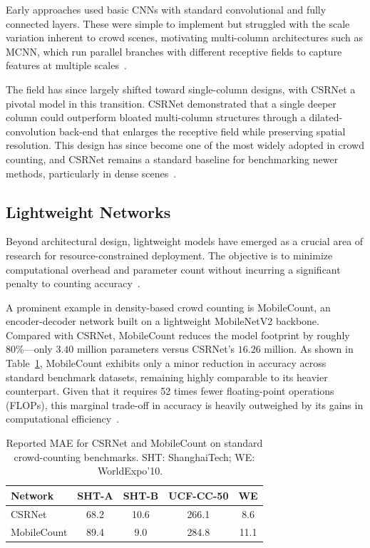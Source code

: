 \documentclass[conference]{IEEEtran}
\begin{document}
Early approaches used basic CNNs with standard convolutional and fully connected
layers. These were simple to implement but struggled with the scale variation
inherent to crowd scenes, motivating multi-column architectures such as MCNN,
which run parallel branches with different receptive fields to capture features
at multiple scales~\cite{Zhang_2016_CVPR}.

The field has since largely shifted toward single-column designs, with CSRNet a
pivotal model in this transition. CSRNet demonstrated that a single deeper column
could outperform bloated multi-column structures through a dilated-convolution
back-end that enlarges the receptive field while preserving spatial resolution.
This design has since become one of the most widely adopted in crowd counting,
and CSRNet remains a standard baseline for benchmarking newer methods,
particularly in dense scenes~\cite{gao2020crowdcountingsurvey, li2018csrnet}.

\subsection{Lightweight Networks}
Beyond architectural design, lightweight models have emerged as a crucial area of
research for resource-constrained deployment. The objective is to minimize
computational overhead and parameter count without incurring a significant
penalty to counting accuracy~\cite{gao2020crowdcountingsurvey,
wang2020mobilecount}.

A prominent example in density-based crowd counting is MobileCount, an
encoder-decoder network built on a lightweight MobileNetV2 backbone. Compared
with CSRNet, MobileCount reduces the model footprint by roughly 80\%---only
$3.40$ million parameters versus CSRNet's $16.26$ million. As shown in
Table~\ref{tab:lit_table}, MobileCount exhibits only a minor reduction in
accuracy across standard benchmark datasets, remaining highly comparable to its
heavier counterpart. Given that it requires 52 times fewer floating-point
operations (FLOPs), this marginal trade-off in accuracy is heavily outweighed by
its gains in computational efficiency~\cite{wang2020mobilecount}.

\begin{table}[t]
    \centering
    \caption{Reported MAE for CSRNet and MobileCount on standard
    crowd-counting benchmarks. SHT: ShanghaiTech; WE: WorldExpo'10.
    ~\cite{wang2020mobilecount, li2018csrnet}}
    \label{tab:lit_table}
    \footnotesize
    \setlength{\tabcolsep}{5pt}
    \begin{tabular}{lcccc}
        \toprule
        Network     & SHT-A & SHT-B & UCF-CC-50 & WE \\
        \midrule
        CSRNet      & 68.2 & 10.6 & 266.1 & 8.6  \\
        MobileCount & 89.4 & 9.0  & 284.8 & 11.1 \\
        \bottomrule
    \end{tabular}
\end{table}
\end{document}
